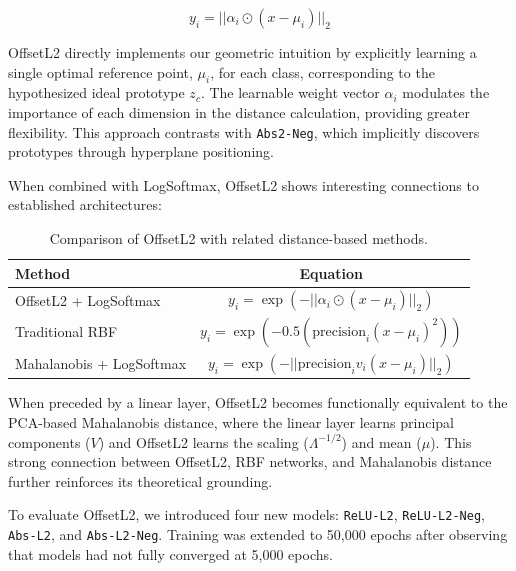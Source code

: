 \[
y_i = || \alpha_i \odot (x - \mu_i) ||_2
\]

OffsetL2 directly implements our geometric intuition by explicitly learning a single optimal reference point, $\mu_i$, for each class, corresponding to the hypothesized ideal prototype $z_c$. The learnable weight vector $\alpha_i$ modulates the importance of each dimension in the distance calculation, providing greater flexibility. This approach contrasts with \texttt{Abs2-Neg}, which implicitly discovers prototypes through hyperplane positioning.

When combined with LogSoftmax, OffsetL2 shows interesting connections to established architectures:

\begin{table}[H]
    \centering
    \footnotesize
    \begin{tabular}{lc}
        \toprule
        \textbf{Method} & \textbf{Equation} \\
        \midrule
        OffsetL2 + LogSoftmax & $ y_i = \exp(-||\alpha_i \odot (x - \mu_i) ||_2) $ \\  
        Traditional RBF & $ y_i = \exp(-0.5 (\text{precision}_i (x - \mu_i)^2)) $ \\  
        Mahalanobis + LogSoftmax & $ y_i = \exp(-||\text{precision}_i v_i (x - \mu_i)||_2) $ \\  
        \bottomrule
    \end{tabular}
    \caption{Comparison of OffsetL2 with related distance-based methods.}
    \label{tab:comparison_offsetl2}
\end{table}

When preceded by a linear layer, OffsetL2 becomes functionally equivalent to the PCA-based Mahalanobis distance, where the linear layer learns principal components ($V$) and OffsetL2 learns the scaling ($\Lambda^{-1/2}$) and mean ($\mu$). This strong connection between OffsetL2, RBF networks, and Mahalanobis distance further reinforces its theoretical grounding.

To evaluate OffsetL2, we introduced four new models: \texttt{ReLU-L2}, \texttt{ReLU-L2-Neg}, \texttt{Abs-L2}, and \texttt{Abs-L2-Neg}. Training was extended to 50,000 epochs after observing that models had not fully converged at 5,000 epochs.


